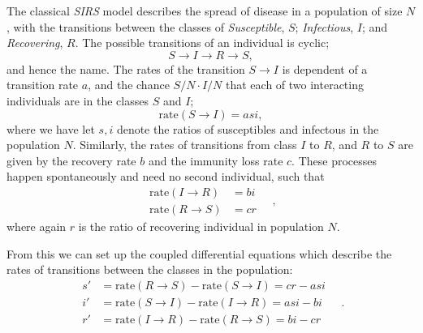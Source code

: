 \documentclass[]{article}
\begin{document}
The classical \textit{SIRS} model describes the spread of disease in a population of size $N$, with the transitions between the classes of \textit{Susceptible}, $S$; \textit{Infectious}, $I$; and \textit{Recovering}, $R$. The possible transitions of an individual is cyclic;
\begin{equation}
	S \rightarrow I \rightarrow R \rightarrow S,
\end{equation}
and hence the name. The rates of the transition $S \rightarrow I$ is dependent of a transition rate $a$, and the chance $S/N \cdot I/N$ that each of two interacting individuals are in the classes $S$ and $I$;
\begin{equation}
	\mathrm{rate}(S \rightarrow I) = asi,
\end{equation}
where we have let $s,i$ denote the ratios of susceptibles and infectous in the population $N$. Similarly, the rates of transitions from class $I$ to $R$, and $R$ to $S$ are given by the recovery rate $b$ and the immunity loss rate $c$. These processes happen spontaneously and need no second individual, such that
\begin{equation}
\begin{aligned}
	\mathrm{rate}(I \rightarrow R) &= bi \\
	\mathrm{rate}(R \rightarrow S) &= cr
\end{aligned} \quad,
\end{equation}
where again $r$ is the ratio of recovering individual in population $N$.

From this we can set up the coupled differential equations which describe the rates of transitions between the classes in the population:
\begin{equation} \label{eq:sirs-classic}
\begin{aligned}
	s' &= \mathrm{rate}(R \rightarrow S) - \mathrm{rate}(S \rightarrow I) = cr - asi \\
	i' &= \mathrm{rate}(S \rightarrow I) - \mathrm{rate}(I \rightarrow R) = asi - bi \\
	r' &= \mathrm{rate}(I \rightarrow R) - \mathrm{rate}(R \rightarrow S) = bi - cr
\end{aligned} \quad .
\end{equation}
\end{document}
